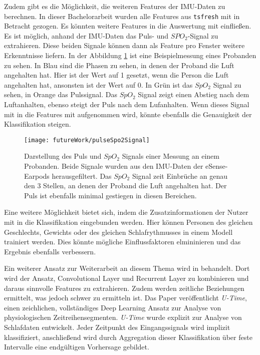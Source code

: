 Zudem gibt es die Möglichkeit, die weiteren Features der IMU-Daten zu berechnen.
In dieser Bachelorarbeit wurden alle Features aus \texttt{tsfresh} mit in Betracht gezogen. 
Es könnten weitere Features in die Auswertung mit einfließen.
Es ist möglich, anhand der IMU-Daten das Puls- und $SPO_2$-Signal zu extrahieren. 
Diese beiden Signale können dann als Feature pro Fenster weitere Erkenntnisse liefern.
In der Abbildung \ref{futureWork:pulseSpo2} ist eine Beispielmessung eines Probanden zu sehen. 
In Blau sind die Phasen zu sehen, in denen der Proband die Luft angehalten hat.
Hier ist der Wert auf 1 gesetzt, wenn die Person die Luft angehalten hat, ansonsten ist der Wert auf 0. 
In Grün ist das $SpO_2$ Signal zu sehen, in Orange das Pulssignal. 
Das $SpO_2$ Signal zeigt einen Abstieg nach dem Luftanhalten, ebenso steigt der Puls nach dem Lufanhalten.
Wenn dieses Signal mit in die Features mit aufgenommen wird, könnte ebenfalls die Genauigkeit der Klassifikation steigen. 
\begin{figure}[ht]
    \centering
    \texttt{[image: futureWork/pulseSpo2Signal]}
    \caption{Darstellung des Puls und $SpO_2$ Signals einer Messung an einem Probanden. Beide Signale wurden aus den IMU-Daten der eSense-Earpods herausgefiltert. Das $SpO_2$ Signal zeit Einbrüche an genau den 3 Stellen, an denen der Proband die Luft angehalten hat. Der Puls ist ebenfalls minimal gestiegen in diesen Bereichen.}
    \label{futureWork:pulseSpo2}
\end{figure}

Eine weitere Möglichkeit bietet sich, indem die Zusatzinformationen der Nutzer mit in die Klassifikation eingebunden werden.
Hier können Personen des gleichen Geschlechts, Gewichts oder des gleichen Schlafrythmusses in einem Modell trainiert werden.
Dies könnte mögliche Einflussfaktoren elmininieren und das Ergebnis ebenfalls verbessern.

Ein weiterer Ansatz zur Weiterarbeit an diesem Thema wird in \cite{perslevUTimeFullyConvolutional2019} behandelt.
Dort wird der Ansatz, Convolutional Layer und Recurrent Layer zu kombinieren und daraus sinnvolle Features zu extrahieren. 
Zudem werden zeitliche Beziehungen ermittelt, was jedoch schwer zu ermitteln ist. 
Das Paper veröffentlicht \textit{U-Time}, einen zeichlichen, vollständiges Deep Learning Ansatz zur Analyse von physiologischen Zeitreihensegmenten. 
\textit{U-Time} wurde explizit zur Analyse von Schlafdaten entwickelt.
Jeder Zeitpunkt des Eingangssignals wird implizit klassifiziert, anschließend wird durch Aggregation dieser Klassifikation über feste Intervalle eine endgültigen Vorhersage gebildet.